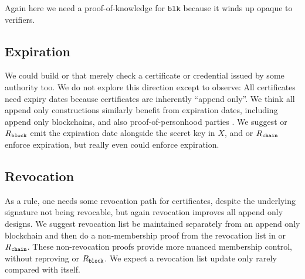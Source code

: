 Again here we need a proof-of-knowledge for $\mathtt{blk}$ because
it winds up opaque to verifiers.


\subsection{Expiration} %

We could build \piring or \pipk that merely check a certificate or
credential issued by some authority too.
We do not explore this direction except to observe: 
All certificates need expiry dates because certificates are inherently
``append only''.  We think all append only \ring constructions similarly
benefit from expiration dates, including append only blockchains, and
also proof-of-personhood parties \cite{pop2008,pop2017}.
We suggest \pisk or $R_{\mathtt{block}}$ emit the expiration date
alongside the secret key in $X$, and \pipk or $R_{\mathtt{chain}}$
enforce expiration, but really even \PedVRF could enforce expiration.

%


\subsection{Revocation}

As a rule, one needs some revocation path for certificates,
despite the underlying signature not being revocable, but again
revocation improves all append only \ring designs.
%
We suggest revocation list be maintained separately from an append only
blockchain and then do a non-membership proof from the revocation list
in \pipk or $R_{\mathtt{chain}}$.  %
These non-revocation proofs provide more nuanced \ring membership
control, without reproving \pisk or $R_{\mathtt{block}}$.
We expect a revocation list update only rarely compared with \ring itself.




